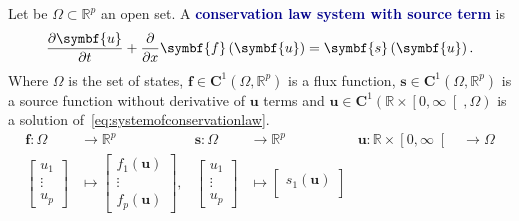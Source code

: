 \documentclass[
    8pt,
    aspectratio=1610,
    c,
    intlimits,
		handout,
    leqno,
    professionalfonts,
]{beamer}
\begin{document}
\begin{frame}
	\begin{definition}
		Let be $\Omega\subset\mathbb{R}^{p}$ an open set.
		A \textcolor{DarkBlue}{\bfseries conservation law system with source term}
		is
		\begin{equation}\label{eq:systemofconservationlaw}
			\diffp{\symbf{u}}{t}+
			\diffp{}{x}
			\symbf{f}\left(\symbf{u}\right)=
			\symbf{s}\left(\symbf{u}\right).
		\end{equation}
		Where $\Omega$ is the set of states,
		\begin{math}
			\symbf{f}\in
			\symbf{C}^{1}
			\left(\Omega,\mathbb{R}^{p}\right)
		\end{math}
		is a flux function,
		\begin{math}
			\symbf{s}\in
			\symbf{C}^{1}
			\left(\Omega,\mathbb{R}^{p}\right)
		\end{math}
		is a source function without derivative of $\symbf{u}$ terms and
		\begin{math}
			\symbf{u}\in
			\symbf{C}^{1}\left(\mathbb{R}\times\left[0,\infty\right[,\Omega\right)
		\end{math} is a solution of~\eqref{eq:systemofconservationlaw}.
		\begin{align*}
			\symbf{f}\colon\Omega
			                               & \longrightarrow\mathbb{R}^{p} &
			\symbf{s}\colon\Omega
			                               & \longrightarrow\mathbb{R}^{p} &
			\symbf{u}\colon\mathbb{R}\times\left[0,\infty\right[
			                               & \longrightarrow\Omega           \\
			\begin{bmatrix}
				u_{1}  \\
				\vdots \\
				u_{p}
			\end{bmatrix}                & \longmapsto
			\begin{bmatrix}
				f_{1}\left(\symbf{u}\right) \\
				\vdots                      \\
				f_{p}\left(\symbf{u}\right)
			\end{bmatrix}, &
			\begin{bmatrix}
				u_{1}  \\
				\vdots \\
				u_{p}
			\end{bmatrix}                & \longmapsto
			\begin{bmatrix}
				s_{1}\left(\symbf{u}\right) \\

\end{bmatrix}
\end{align*}
\end{definition}
\end{frame}
\end{document}
